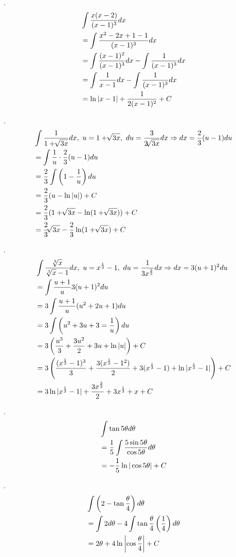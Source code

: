 \documentclass[11pt]{article}
\newcommand*{\vs}{\vspace{1cm}}
\newcommand*{\next}{\noindent}
\newcommand*{\set}{\setcounter{equation}{0}}
\newcommand*{\lt}{\left}
\newcommand*{\rt}{\right}
\begin{document}
\vs\next
26.\begin{align}
    \set
    &\int\frac{x(x-2)}{(x-1)^3}dx\\
    &=\int\frac{x^2-2x+1-1}{(x-1)^3}dx\\
    &=\int\frac{(x-1)^2}{(x-1)^3}dx-\int\frac{1}{(x-1)^3}dx\\
    &=\int\frac{1}{x-1}dx-\int\frac{1}{(x-1)^3}dx\\
    &=\ln|x-1|+\frac{1}{2(x-1)^2}+C
\end{align}

\vs\next
28.\begin{align}
    \set
    &\int\frac{1}{1+\sqrt[]{3x}}dx,\,\, u=1+\sqrt[]{3x},\,\, du=\frac{3}{2\sqrt[]{3x}}dx\Rightarrow dx=\frac{2}{3}(u-1)du\\
    &=\int\frac{1}{u}\cdot\frac{2}{3}(u-1)du\\
    &=\frac{2}{3}\int\lt(1-\frac{1}{u}\rt)du\\
    &=\frac{2}{3}(u-\ln|u|)+C\\
    &=\frac{2}{3}(1+\sqrt[]{3x}-\ln(1+\sqrt[]{3x}))+C\\
    &=\frac{2}{3}\sqrt[]{3x}-\frac{2}{3}\ln(1+\sqrt[]{3x})+C
\end{align}

\vs\next
30.\begin{align}
    \set
    &\int\frac{\sqrt[3]{x}}{\sqrt[3]{x}-1}dx,\,\, u=x^{\frac{1}{3}}-1,\,\, du=\frac{1}{3x^{\frac{2}{3}}}dx\Rightarrow dx=3(u+1)^2du\\
    &=\int\frac{u+1}{u}3(u+1)^2du\\
    &=3\int\frac{u+1}{u}(u^2+2u+1)du\\
    &=3\int\lt(u^2+3u+3=\frac{1}{u}\rt)du\\
    &=3\lt(\frac{u^3}{3}+\frac{3u^2}{2}+3u+\ln|u|\rt)+C\\
    &=3\lt(\frac{(x^{\frac{1}{3}}-1)^3}{3}+\frac{3(x^{\frac{1}{3}}-1^2)}{2}+3(x^{\frac{1}{3}}-1)+\ln|x^{\frac{1}{3}}-1|\rt)+C\\
    &=3\ln|x^{\frac{1}{3}}-1|+\frac{3x^{\frac{2}{3}}}{2}+3x^{\frac{1}{3}}+x+C
\end{align}

\vs\next
32.\begin{align}
    \set
    &\int\tan 5\theta d\theta\\
    &=\frac{1}{5}\int\frac{5\sin 5\theta}{\cos 5\theta}d\theta\\
    &=-\frac{1}{5}\ln|\cos 5\theta|+C
\end{align}

\vs\next
36.\begin{align}
    \set
    &\int\lt(2-\tan\frac{\theta}{4}\rt)d\theta\\
    &=\int 2d\theta-4\int\tan\frac{\theta}{4}\lt(\frac{1}{4}\rt)d\theta\\
    &=2\theta+4\ln\lt|\cos\frac{\theta}{4}\rt|+C
\end{align}
\end{document}
